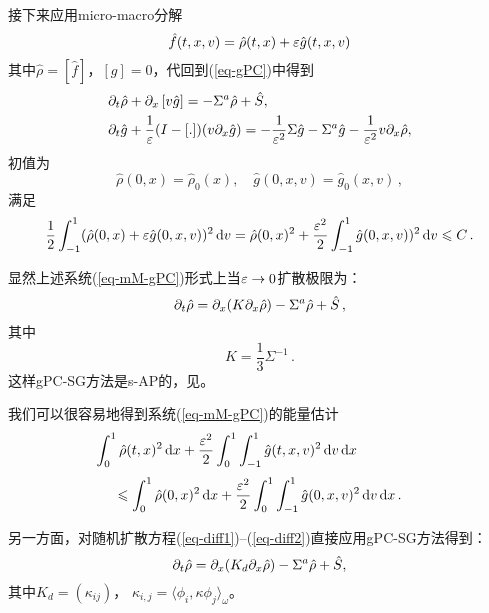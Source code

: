 接下来应用micro-macro分解
\begin{equation}
\label{micro-macro}
   \hat f(t,x,v) = \hat{\rho}(t,x) + \varepsilon \hat{g}(t,x,v)
\end{equation}
其中$\hat \rho=[\hat f]$，$[g]=0$，代回到(\ref{eq-gPC})中得到
\begin{subequations}\label{eq-mM-gPC}
\begin{align}
& \partial_t \hat \rho + \partial_x\left[ v \hat g \right] = -\Sigma^a \hat \rho + \hat S,\label{eq-mMrho-gPC}  \\
& \partial_t \hat g + \frac{1}{\varepsilon} (I-\left[ . \right]) (v\partial_x \hat g) =
-\frac{1}{\varepsilon^2} \Sigma \hat g - \Sigma^a \hat g
- \frac{1}{\varepsilon^2}v \partial_x \hat \rho,\label{eq-mMg-gPC}
\end{align}
\end{subequations}
初值为
$$
  \hat \rho(0,x) =  \hat \rho_0(x), \quad
  \hat g(0,x,v) =  \hat g_0(x,v)\,,
$$
满足
$$
   \frac12 \int_{-1}^{1}  (\hat \rho(0,x) + \varepsilon  \hat g(0,x,v))^2 \mathop{}\!\mathrm{d} v =
    \hat \rho(0,x)^2 +   \frac{\varepsilon^2}2 \int_{-1}^{1}  \hat g(0,x,v))^2 \mathop{}\!\mathrm{d} v
\leqslant C\,.
$$

显然上述系统(\ref{eq-mM-gPC})形式上当$\varepsilon \to 0$扩散极限为：
\begin{equation}  \label{eq-diff-gPC}
\partial_t \hat \rho =  \partial_{x} (K  \partial_{x}\hat \rho) - \Sigma^a \hat \rho
+ \hat S\,,
\end{equation}
其中
\[K =\frac{1}{3} \Sigma^{-1}\,.
\]
这样gPC-SG方法是s-AP的，见。


我们可以很容易地得到系统(\ref{eq-mM-gPC})的能量估计
$$
  \int_0^1\hat  \rho(t,x)^2\mathop{}\!\mathrm{d} x
  + \frac{\varepsilon^2}2 \int_0^1 \int_{-1}^{1} \hat g(t,x,v)^2 \mathop{}\!\mathrm{d} v \mathop{}\!\mathrm{d} x  \qquad \ \qquad \
$$
$$
  \leqslant
    \int_0^1 \hat \rho(0,x)^2 \mathop{}\!\mathrm{d} x+   \frac{\varepsilon^2}2 \int_0^1 \int_{-1}^{1}  \hat g(0,x,v)^2 \mathop{}\!\mathrm{d} v \mathop{}\!\mathrm{d} x\,.
$$

另一方面，对随机扩散方程(\ref{eq-diff1})--(\ref{eq-diff2})直接应用gPC-SG方法得到：
\begin{equation}  \label{eq-diff-gPC-approx}
\partial_t \hat \rho =  \partial_{x} (K_d \partial_{x}\hat \rho)- \Sigma^a \hat \rho
+ \hat S,
\end{equation}
其中$K_d = (\kappa_{ij})$， $\kappa_{i,j}= \langle \phi_i, \kappa\phi_j \rangle_\omega$。


